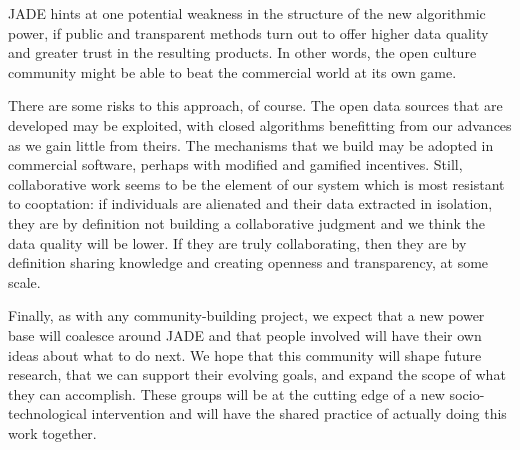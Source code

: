 \documentclass{sigchi-ext}
\begin{document}
JADE hints at one potential weakness in the structure of the new algorithmic power, if public and transparent methods turn out to offer higher data quality and greater trust in the resulting products.  In other words, the open culture community might be able to beat the commercial world at its own game.

There are some risks to this approach, of course.  The open data sources that are developed may be exploited, with closed algorithms benefitting from our advances as we gain little from theirs.  The mechanisms that we build may be adopted in commercial software, perhaps with modified and gamified incentives.  Still, collaborative work seems to be the element of our system which is most resistant to cooptation: if individuals are alienated and their data extracted in isolation, they are by definition not building a collaborative judgment and we think the data quality will be lower.  If they are truly collaborating, then they are by definition sharing knowledge and creating openness and transparency, at some scale.

Finally, as with any community-building project, we expect that a new power base will coalesce around JADE and that people involved will have their own ideas about what to do next.  We hope that this community will shape future research, that we can support their evolving goals, and expand the scope of what they can accomplish.  These groups will be at the cutting edge of a new socio-technological intervention and will have the shared practice of actually doing this work together.

\balance{}



\end{document}
